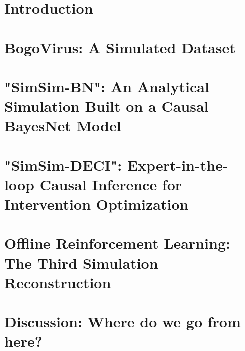 \documentclass{article}
\begin{document}
\section{Introduction}
\label{sec:introduction}


\section{BogoVirus: A Simulated Dataset}
\label{sec:bogovirus_dataset}


\section{"SimSim-BN": An Analytical Simulation Built on a Causal BayesNet Model}
\label{sec:bayesnet_simsim}


\section{"SimSim-DECI": Expert-in-the-loop Causal Inference for Intervention Optimization}
\label{sec:deci_simsim}


\section{Offline Reinforcement Learning: The Third Simulation Reconstruction}
\label{sec:rl}


\section{Discussion: Where do we go from here?}





\end{document}
